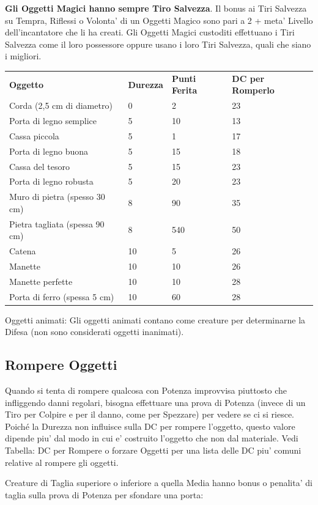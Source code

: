 \documentclass[a4paper,11pt,twoside,openany]{book}
\begin{document}
{\textbf{Gli Oggetti Magici hanno sempre Tiro Salvezza}. Il bonus ai
Tiri Salvezza su Tempra, Riflessi o Volonta' di un Oggetti Magico sono
pari a 2 + meta' Livello dell'incantatore che li ha creati. Gli Oggetti
Magici custoditi effettuano i Tiri Salvezza come il loro possessore
oppure usano i loro Tiri Salvezza, quali che siano i migliori.

\bigskip

\begin{tabular}{L{6cm} L{3cm} L{3cm} L{3cm}}
\toprule
\textbf{Oggetto} & \textbf{Durezza} & \textbf{Punti Ferita} & \textbf{DC per Romperlo}\tabularnewline
Corda (2,5 cm di diametro) & 0 & 2 & 23\tabularnewline
Porta di legno semplice & 5 & 10 & 13\tabularnewline
Cassa piccola & 5 & 1 & 17\tabularnewline
Porta di legno buona & 5 & 15 & 18\tabularnewline
Cassa del tesoro & 5 & 15 & 23\tabularnewline
Porta di legno robusta & 5 & 20 & 23\tabularnewline
Muro di pietra (spesso 30 cm) & 8 & 90 & 35\tabularnewline
Pietra tagliata (spessa 90 cm) & 8 & 540 & 50\tabularnewline
Catena & 10 & 5 & 26\tabularnewline
Manette & 10 & 10 & 26\tabularnewline
Manette perfette & 10 & 10 & 28\tabularnewline
Porta di ferro (spessa 5 cm) & 10 & 60 & 28\tabularnewline
\end{tabular}

\bigskip

Oggetti animati: Gli oggetti animati contano come creature per determinarne
la Difesa (non sono considerati oggetti inanimati).

\subsection{Rompere Oggetti}

\label{rompere-oggetti}

Quando si tenta di rompere qualcosa con Potenza improvvisa piuttosto che infliggendo danni regolari, bisogna effettuare una prova di Potenza (invece di un Tiro per Colpire e per il danno, come per Spezzare) per vedere se ci si riesce. Poiché la Durezza non influisce sulla DC per rompere l'oggetto, questo valore dipende piu' dal modo in cui e' costruito l'oggetto che non dal materiale. Vedi Tabella: DC per Rompere o forzare Oggetti per una lista delle DC piu' comuni relative al rompere gli oggetti.

Creature di Taglia superiore o inferiore a quella Media hanno bonus o penalita' di taglia sulla prova di Potenza per sfondare una porta:

\bigskip

}
\end{document}
